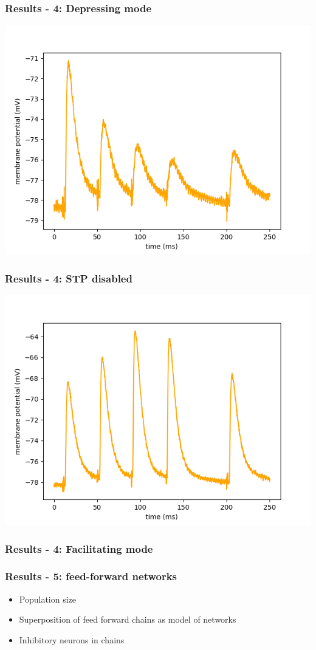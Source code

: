 \documentclass{beamer}
\begin{document}
\begin{frame}
	\frametitle{Results - 4: Depressing mode}
	\centering
	\includegraphics[width=\textwidth]{figures/stp_depressing.png}
\end{frame}
\begin{frame}
	\frametitle{Results - 4: STP disabled}
	\centering
	\includegraphics[width=\textwidth]{figures/stp_off.png}
\end{frame}

\begin{frame}
	\frametitle{Results - 4: Facilitating mode}

\end{frame}

\begin{frame}
    \frametitle{Results - 5: feed-forward networks}
    \begin{itemize}
        \item Population size
        \item Superposition of feed forward chains as model of networks
        \item Inhibitory neurons in chains
    \end{itemize}
\end{frame}
\end{document}

